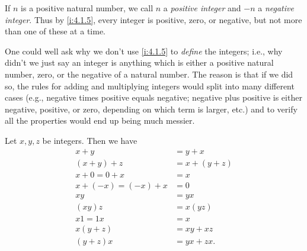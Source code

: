 \begin{note}
  If \(n\) is a positive natural number, we call \(n\) a \emph{positive integer} and \(-n\) a \emph{negative integer}.
  Thus by \cref{i:4.1.5}, every integer is positive, zero, or negative, but not more than one of these at a time.
\end{note}

\begin{note}
  One could well ask why we don't use \cref{i:4.1.5} to \emph{define} the integers;
  i.e., why didn't we just say an integer is anything which is either a positive natural number, zero, or the negative of a natural number.
  The reason is that if we did so, the rules for adding and multiplying integers would split into many different cases (e.g., negative times positive equals negative; negative plus positive is either negative, positive, or zero, depending on which term is larger, etc.) and to verify all the properties would end up being much messier.
\end{note}

\begin{prop}\label{i:4.1.6}
  Let \(x, y, z\) be integers.
  Then we have
  \begin{align*}
    x + y               & = y + x       \\
    (x + y) + z         & = x + (y + z) \\
    x + 0 = 0 + x       & = x           \\
    x + (-x) = (-x) + x & = 0           \\
    xy                  & = yx          \\
    (xy)z               & = x(yz)       \\
    x1 = 1x             & = x           \\
    x(y + z)            & = xy + xz     \\
    (y + z)x            & = yx + zx.
  \end{align*}
\end{prop}

